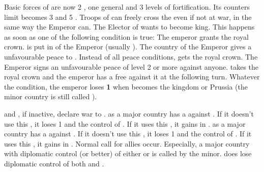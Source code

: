 \effetlong
\aparag Basic forces of \paysBrandebourg are now 2 \ARMY\faceplus, one general
and 3 levels of fortification.
\bparag Its counters limit becomes 3 \ARMY and 5 \LD.
\aparag Troops of \paysBrandebourg can freely cross the \HRE even if not at
war, in the same way the Emperor can.
\aparag The Elector of \paysBrandebourg wants to become king. This happens as
soon as one of the following condition is true:
\bparag The emperor grants the royal crown. \paysBrandebourg is put in \EC of
the Emperor (usually \HAB).
\bparag The country of the Emperor gives a unfavourable peace to
\paysBrandebourg. Instead of all peace conditions, \paysBrandebourg gets the
royal crown.
\bparag The Emperor signs an unfavourable peace of level 2 or more against
anyone. \paysBrandebourg takes the royal crown and the emperor has a free \CB
against it at the following turn.
\aparag Whatever the condition, the emperor loses {\bf 1} \STAB when
\paysBrandebourg becomes the kingdom or Prussia (the minor country is still
called \paysBrandebourg).





\phevnt
\aparag \DANMin and \PRUmin, if inactive, declare war to \SUE.
\aparag \PRU as a major country has a \CB against \SUE. If it doesn't use this
\CB, it loses 1 \STAB and the control of \paysDanemark. If it uses this \CB,
it gains \paysDanemark in \EG.
\aparag \DAN as a major country has a \CB against \SUE. If it doesn't use this
\CB, it loses 1 \STAB and the control of \PRUmin. If it uses this \CB, it
gains \PRUmin in \EG.
\aparag Normal call for allies occur. Especially, a major country with
diplomatic control (\AM or better) of either \DANmin or \PRUmin is called by
the minor.
\aparag \SUE does lose diplomatic control of both \paysDanemark and
\paysBrandebourg.



